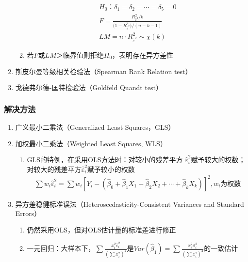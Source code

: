 \documentclass[12pt]{book}
\begin{document}
\begin{enumerate}[1.]
\begin{enumerate}[(1)]
\begin{gather*}
                        H_0：δ_1=δ_2=\cdots=δ_5=0\\
                        F=\frac{R_{{\hat{\varepsilon}}^2}^2/k}{{(1-R}_{{\hat{\varepsilon}}^2}^2)/(n-k-1)}\\
                        LM=n⋅R_{{\hat{\varepsilon}}^2}^2\sim \chi(k)
                    \end{gather*}
              \item 若$F$或$LM$＞临界值则拒绝$H_0$，表明存在异方差性
          \end{enumerate}
    \item 斯皮尔曼等级相关检验法（Spearman Rank Relation test）
    \item 戈德弗尔德-匡特检验法（Goldfeld Quandt test）
\end{enumerate}



\subsubsection{解决方法}

\begin{enumerate}[1.]
    \item 广义最小二乘法（Generalized Least Squares，GLS）
    \item 加权最小二乘法（Weighted Least Squares, WLS）
          \begin{enumerate}[(1)]
              \item GLS的特例，在采用OLS方法时：对较小的残差平方 $\hat{\varepsilon}_i^2$赋予较大的权数；对较大的残差平方$\hat{\varepsilon}_i^2$赋予较小的权数
                    \begin{gather*}
                        \sum{w_i \hat{\varepsilon}_i^2}=\sum{w_i\left[Y_i-(\hat{\beta}_0+\hat{\beta}_1 X_1 + \hat{\beta}_2 X_2 +\cdots+\hat{\beta}_k X_k)\right]^2}, w_i\text{为权数}
                    \end{gather*}
          \end{enumerate}
    \item 异方差稳健标准误法（Heteroscedasticity-Consistent Variances and Standard Errors）
          \begin{enumerate}[(1)]
              \item 仍然采用OLS，但对OLS估计量的标准差进行修正
              \item 一元回归：大样本下，$\sum{ \frac{x_i^2 \hat{\varepsilon}_i^2}{(\sum{x_i^2})^2}}$是$Var(\hat{\beta}_1) = \sum{ \frac{x_i^2 \sigma_i^2}{(\sum{x_i^2})^2}}$的一致估计
          \end{enumerate}
\end{enumerate}
\end{document}
